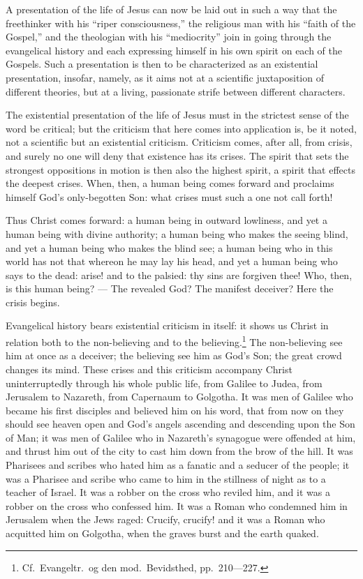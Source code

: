 \documentclass[12pt,a4paper]{book}
\begin{document}
A presentation of the life of Jesus can now be laid out in such a way that the freethinker
with his ``riper consciousness,'' the religious man with his ``faith of the Gospel,'' and
the theologian with his ``mediocrity'' join in going through the evangelical history and
each expressing himself in his own spirit on each of the Gospels. Such a presentation is
then to be characterized as an existential presentation, insofar, namely, as it aims not at
a scientific juxtaposition of different theories, but at a living, passionate strife between
different characters.

The existential presentation of the life of Jesus must in the strictest sense of the word be
critical; but the criticism that here comes into application is, be it noted, not a
scientific but an existential criticism. Criticism comes, after all, from crisis, and surely
no one will deny that existence has its crises. The spirit that sets the strongest
oppositions in motion is then also the highest spirit, a spirit that effects the deepest
crises. When, then, a human
being comes forward and proclaims himself God's only-begotten Son: what crises must such a
one not call forth!

Thus Christ comes forward: a human being in outward lowliness, and yet a human being with
divine authority; a human being who makes the seeing blind, and yet a human being who makes
the blind see; a human being who in this world has not that whereon he may lay his head, and
yet a human being who says to the dead: arise! and to the palsied: thy sins are forgiven
thee! Who, then, is this human being? --- The revealed God? The manifest deceiver? Here the
crisis begins.

Evangelical history bears existential criticism in itself: it shows us Christ in relation
both to the non-believing and to the believing.\footnote{Cf.\ Evangeltr.\ og den mod.\
Bevidsthed, pp.\ 210---227.} The non-believing see him at once as a deceiver; the believing
see him as God's Son; the great crowd changes its mind. These crises and this criticism
accompany Christ uninterruptedly through his whole public life, from Galilee to Judea, from
Jerusalem to Nazareth, from Capernaum to Golgotha. It was men of Galilee who became his
first disciples and believed him on his word, that from now on they should see heaven open
and God's angels ascending and descending upon the Son of Man; it was men of Galilee who in
Nazareth's synagogue were offended at him, and thrust him out of the city to cast him down
from the brow of the hill. It was Pharisees and scribes who hated him as a fanatic and a
seducer of the people; it was a Pharisee and scribe who came to him in the stillness of
night as to a teacher of Israel. It was a robber on the cross who reviled him, and it was a
robber on the cross who confessed him. It was a Roman who condemned him in Jerusalem when
the Jews raged: Crucify, crucify! and it was a Roman who acquitted him on Golgotha, when the
graves burst and the earth quaked.
\end{document}

